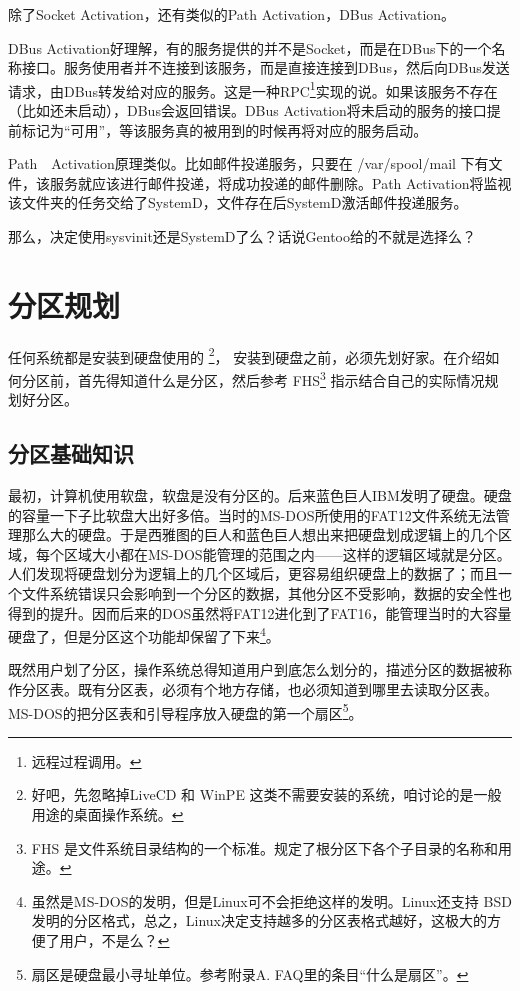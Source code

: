 \documentclass[amstex,twoside]{ctexbook}
\begin{document}
除了Socket Activation，还有类似的Path Activation，DBus Activation。 

DBus Activation好理解，有的服务提供的并不是Socket，而是在DBus下的一个名称接口。服务使用者并不连接到该服务，而是直接连接到DBus，然后向DBus发送请求，由DBus转发给对应的服务。这是一种RPC\footnote{远程过程调用。}实现的说。如果该服务不存在（比如还未启动），DBus会返回错误。DBus Activation将未启动的服务的接口提前标记为“可用”，等该服务真的被用到的时候再将对应的服务启动。

Path　Activation原理类似。比如邮件投递服务，只要在 /var/spool/mail 下有文件，该服务就应该进行邮件投递，将成功投递的邮件删除。Path Activation将监视该文件夹的任务交给了SystemD，文件存在后SystemD激活邮件投递服务。

那么，决定使用sysvinit还是SystemD了么？话说Gentoo给的不就是选择么？


\section{分区规划}
任何系统都是安装到硬盘使用的
\footnote{好吧，先忽略掉LiveCD 和  WinPE 这类不需要安装的系统，咱讨论的是一般用途的桌面操作系统。}，
安装到硬盘之前，必须先划好家。在介绍如何分区前，首先得知道什么是分区，然后参考
FHS\footnote{FHS 是文件系统目录结构的一个标准。规定了根分区下各个子目录的名称和用途。}
指示结合自己的实际情况规划好分区。

\subsection{分区基础知识}
最初，计算机使用软盘，软盘是没有分区的。后来蓝色巨人IBM发明了硬盘。硬盘的容量一下子比软盘大出好多倍。当时的MS-DOS所使用的FAT12文件系统无法管理那么大的硬盘。于是西雅图的巨人和蓝色巨人想出来把硬盘划成逻辑上的几个区域，每个区域大小都在MS-DOS能管理的范围之内——这样的逻辑区域就是分区。人们发现将硬盘划分为逻辑上的几个区域后，更容易组织硬盘上的数据了；而且一个文件系统错误只会影响到一个分区的数据，其他分区不受影响，数据的安全性也得到的提升。因而后来的DOS虽然将FAT12进化到了FAT16，能管理当时的大容量硬盘了，但是分区这个功能却保留了下来\footnote{虽然是MS-DOS的发明，但是Linux可不会拒绝这样的发明。Linux还支持 BSD 发明的分区格式，总之，Linux决定支持越多的分区表格式越好，这极大的方便了用户，不是么？}。

既然用户划了分区，操作系统总得知道用户到底怎么划分的，描述分区的数据被称作分区表。既有分区表，必须有个地方存储，也必须知道到哪里去读取分区表。MS-DOS的把分区表和引导程序放入硬盘的第一个扇区\footnote{扇区是硬盘最小寻址单位。参考附录A. FAQ里的条目“什么是扇区”。}。
\end{document}
